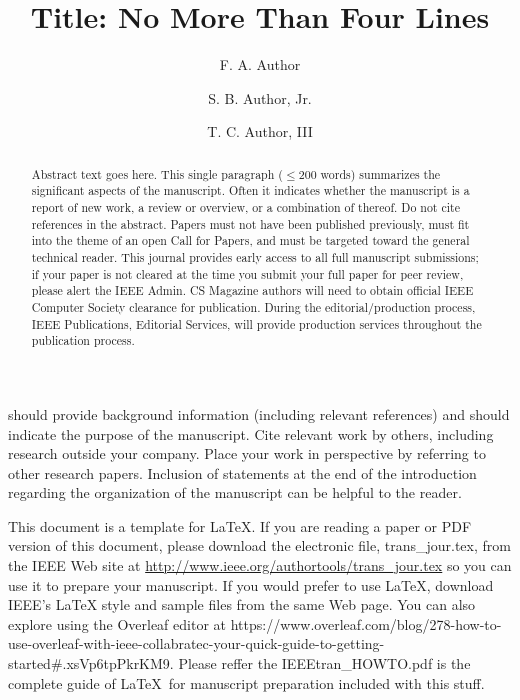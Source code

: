 \documentclass{IEEEcsmag}
\begin{document}

\title{Title: No More Than Four Lines}

\author{F. A. Author}

\author{S. B. Author, Jr.}

\author{T. C. Author, III}


\begin{abstract}
Abstract text goes here. This single paragraph ($\le$200 words) summarizes the significant aspects of the manuscript. Often it indicates whether the manuscript is a report of new work, a review or overview, or a combination of thereof. Do not cite references in the abstract. Papers must not have been published previously, must fit into the theme of an open Call for Papers, and must be targeted toward the general technical reader. This journal provides early access to all full manuscript submissions; if your paper is not cleared at the time you submit your full paper for peer review, please alert the IEEE Admin. CS Magazine authors will need to obtain official IEEE Computer Society clearance for publication. During the editorial/production process, IEEE Publications, Editorial Services, will provide production services throughout the publication process.
\end{abstract}

\maketitle


 should provide background information (including relevant references) and should indicate the purpose of the manuscript. Cite relevant work by others, including research outside your company. Place your work in perspective by referring to other research papers. Inclusion of statements at the end of the introduction regarding the organization of the manuscript can be helpful to the reader.


This document is a template for \LaTeX. If you are reading a paper or PDF version of this document, please\vadjust{\vfill\pagebreak} download the electronic file, trans\_jour.tex, from the IEEE Web site at \url{http://www.ieee.org/authortools/trans_jour.tex} so you can use it to prepare your manuscript. If you would prefer to use LaTeX, download IEEE's LaTeX style and sample files from the same Web page. You can also explore using the Overleaf editor at {https://www.overleaf.com/blog/278-how-to-use-overleaf-with-ieee-collabratec-your-quick-guide-to-getting-started\#.xsVp6tpPkrKM9}. Please reffer the IEEEtran\_HOWTO.pdf is the complete guide of \LaTeX\ for manuscript preparation included with this stuff.
\end{document}
